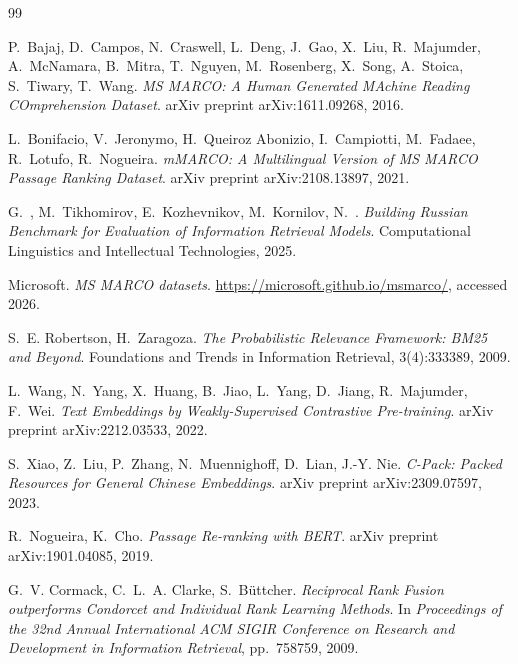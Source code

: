 \documentclass[runningheads,a4paper]{llncs}
\begin{document}
\begin{thebibliography}{99}

P.~Bajaj, D.~Campos, N.~Craswell, L.~Deng, J.~Gao, X.~Liu, R.~Majumder, A.~McNamara, B.~Mitra, T.~Nguyen, M.~Rosenberg, X.~Song, A.~Stoica, S.~Tiwary, T.~Wang.
\newblock \textit{MS MARCO: A Human Generated MAchine Reading COmprehension Dataset}.
\newblock arXiv preprint arXiv:1611.09268, 2016.

L.~Bonifacio, V.~Jeronymo, H.~Queiroz Abonizio, I.~Campiotti, M.~Fadaee, R.~Lotufo, R.~Nogueira.
\newblock \textit{mMARCO: A Multilingual Version of MS MARCO Passage Ranking Dataset}.
\newblock arXiv preprint arXiv:2108.13897, 2021.

G.~, M.~Tikhomirov, E.~Kozhevnikov, M.~Kornilov, N.~.
\newblock \textit{Building Russian Benchmark for Evaluation of Information Retrieval Models}.
\newblock Computational Linguistics and Intellectual Technologies, 2025.



Microsoft.
\newblock \textit{MS MARCO datasets}.
\newblock \url{https://microsoft.github.io/msmarco/}, accessed 2026.

S.~E. Robertson, H.~Zaragoza.
\newblock \textit{The Probabilistic Relevance Framework: BM25 and Beyond}.
\newblock Foundations and Trends in Information Retrieval, 3(4):333\textendash{}389, 2009.

L.~Wang, N.~Yang, X.~Huang, B.~Jiao, L.~Yang, D.~Jiang, R.~Majumder, F.~Wei.
\newblock \textit{Text Embeddings by Weakly-Supervised Contrastive Pre-training}.
\newblock arXiv preprint arXiv:2212.03533, 2022.

S.~Xiao, Z.~Liu, P.~Zhang, N.~Muennighoff, D.~Lian, J.-Y. Nie.
\newblock \textit{C-Pack: Packed Resources for General Chinese Embeddings}.
\newblock arXiv preprint arXiv:2309.07597, 2023.

R.~Nogueira, K.~Cho.
\newblock \textit{Passage Re-ranking with BERT}.
\newblock arXiv preprint arXiv:1901.04085, 2019.

G.~V. Cormack, C.~L.~A. Clarke, S.~B{\"u}ttcher.
\newblock \textit{Reciprocal Rank Fusion outperforms Condorcet and Individual Rank Learning Methods}.
\newblock In \textit{Proceedings of the 32nd Annual International ACM SIGIR Conference on Research and Development in Information Retrieval}, pp.~758\textendash{}759, 2009.


\end{thebibliography}
\end{document}

